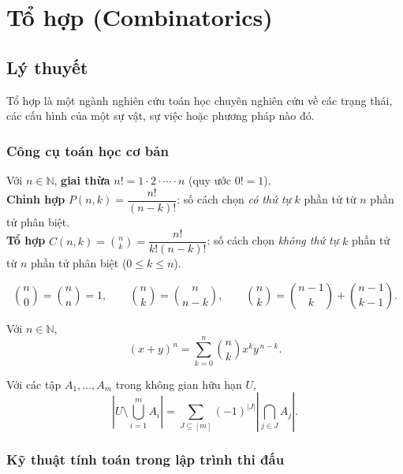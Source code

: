 \chapter{Tổ hợp (Combinatorics)}

\minitoc

\section{Lý thuyết}

Tổ hợp là một ngành nghiên cứu toán học chuyên nghiên cứu về các trạng thái, các cấu hình của một sự vật, sự việc hoặc phương pháp nào đó.

\subsection{Công cụ toán học cơ bản}
\label{subsec:comb-basic}

\begin{dinhnghia}
Với $n\in\mathbb{N}$, \textbf{giai thừa} $n! = 1\cdot 2\cdot \cdots \cdot n$ (quy ước $0!=1$).\\
\textbf{Chỉnh hợp} $P(n,k)=\dfrac{n!}{(n-k)!}$: số cách chọn \emph{có thứ tự} $k$ phần tử từ $n$ phần tử phân biệt.\\
\textbf{Tổ hợp} $C(n,k)=\binom{n}{k}=\dfrac{n!}{k!(n-k)!}$: số cách chọn \emph{không thứ tự} $k$ phần tử từ $n$ phần tử phân biệt ($0\le k\le n$).
\end{dinhnghia}

\begin{tinhchat}
\[
\binom{n}{0}=\binom{n}{n}=1,\qquad
\binom{n}{k}=\binom{n}{n-k},\qquad
\binom{n}{k}=\binom{n-1}{k}+\binom{n-1}{k-1}.
\]
\end{tinhchat}

\begin{dinhly}
Với $n\in\mathbb{N}$,
\[
(x+y)^n = \sum_{k=0}^n \binom{n}{k}x^k y^{\,n-k}.
\]
\end{dinhly}

\begin{dinhnghia}
Với các tập $A_1,\dots,A_m$ trong không gian hữu hạn $U$,
\[
\left|U\setminus\bigcup_{i=1}^{m}A_i\right|
= \sum_{J\subseteq[m]}(-1)^{|J|}\left|\bigcap_{j\in J}A_j\right|.
\]
\end{dinhnghia}


\subsection{Kỹ thuật tính toán trong lập trình thi đấu}
\label{subsec:comb-impl}

